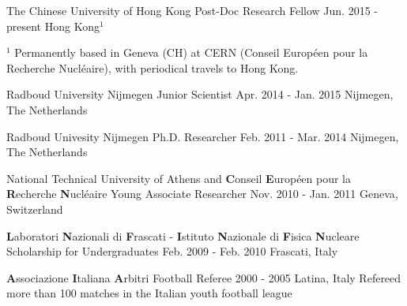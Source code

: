 
\begin{cventries}
\cventry
{The Chinese University of Hong Kong} %
{Post-Doc Research Fellow} %
{Jun. 2015 - present} %
{Hong Kong$^{1}$}
{\CurStatDet}
\vspace{-0.5em}
        
{\tiny $^{1}$ Permanently based in Geneva (CH) at CERN (Conseil Europ\'een pour
la Recherche Nucl\'eaire), with periodical travels to Hong Kong.}

\cventry
{Radboud University Nijmegen} %
{Junior Scientist} %
{Apr. 2014 - Jan. 2015} %
{Nijmegen, The Netherlands} %
{\JuniorScientist}

\cventry
{Radboud Univesity Nijmegen} %
{Ph.D. Researcher} %
{Feb. 2011  - Mar. 2014} %
{Nijmegen, The Netherlands} %
{\Phd}

\cventry
{National Technical University of Athens and \textbf{C}onseil
\textbf{E}urop\'een pour la \textbf{R}echerche
\textbf{N}ucl\'eaire} %
{Young Associate Researcher} %
{Nov. 2010 - Jan. 2011} %
{Geneva, Switzerland} %
{\CERN}

\cventry
{\textbf{L}aboratori \textbf{N}azionali di \textbf{F}rascati -
\textbf{I}stituto \textbf{N}azionale di \textbf{F}isica \textbf{N}ucleare} %
{Scholarship for Undergraduates} %
{Feb. 2009 - Feb. 2010} %
{Frascati, Italy} %
{\Master}

\cventry
{\textbf{A}ssociazione \textbf{I}taliana \textbf{A}rbitri} %
{Football Referee} %
{2000 - 2005} %
{Latina, Italy} %
{Refereed more than 100 matches in the Italian youth football league}

\end{cventries}

